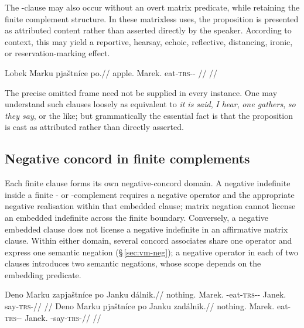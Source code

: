 The -clause may also occur without an overt matrix predicate, while
retaining the finite complement structure. In these matrixless uses, the
proposition is presented as attributed content rather than asserted directly by
the speaker. According to context, this may
yield a reportive, hearsay, echoic, reflective, distancing, ironic, or
reservation-marking effect.

\ex
\begingl
\gla Lobek Marku pjaštníce po.//
\glb apple.\Dir{} Marek.\Trs{} eat-\textsc{trs}-\Pf{}-\Lnk{} \Compl{}//
\glft {}//
\endgl
\xe

The precise omitted frame need not be supplied in every instance. One may
understand such clauses loosely as equivalent to \textit{it is said}, \textit{I
hear}, \textit{one gathers}, \textit{so they say}, or the like; but
grammatically the essential fact is that the proposition is cast as attributed
rather than directly asserted.

\subsection{Negative concord in finite complements}
\label{sec:complex-negative-concord}

Each finite clause forms its own negative-concord domain. A negative
indefinite inside a finite - or -complement requires a
negative operator and the appropriate negative realisation within that
embedded clause; matrix negation cannot license an embedded indefinite
across the finite boundary. Conversely, a negative embedded clause does not
license a negative indefinite in an affirmative matrix clause. Within either
domain, several concord associates share one operator and express one
semantic negation (§\,\ref{sec:vm-neg}); a negative operator in each of two
clauses introduces two semantic negations, whose scope depends on the
embedding predicate.

\pex\label{ex:embedded-negative-concord}
\a
\begingl
\gla Deno Marku zapjaštníce po Janku dálnik.//
\glb nothing.\Dir{} Marek.\Trs{} \Neg{}-eat-\textsc{trs}-\Pf{}-\Lnk{} \Compl{} Janek.\Trs{} say-\textsc{trs}-\Pf{}//
\glft {}
  //
\endgl
\a
\begingl
\gla *Deno Marku pjaštníce po Janku zadálnik.//
\glb nothing.\Dir{} Marek.\Trs{} eat-\textsc{trs}-\Pf{}-\Lnk{} \Compl{} Janek.\Trs{} \Neg{}-say-\textsc{trs}-\Pf{}//
\glft {}
  //
\endgl
\xe

